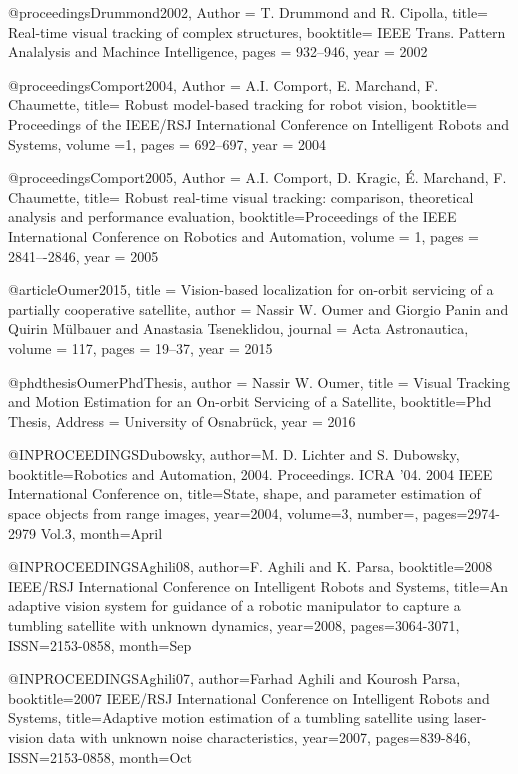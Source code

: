 
@proceedings{Drummond2002,
Author = {T. Drummond and R. Cipolla},
title=  {Real-time visual tracking of complex structures},
booktitle= {IEEE Trans. Pattern Analalysis and Machince Intelligence},
pages = {932--946},
year = {2002}
}

@proceedings{Comport2004,
Author ={ A.I. Comport, E. Marchand, F. Chaumette},
title=  {Robust model-based tracking for robot vision},
booktitle= {Proceedings of the IEEE/RSJ International Conference on Intelligent Robots and Systems},
volume ={1},
pages = {692--697},
year = {2004}
}


@proceedings{Comport2005,
Author = {A.I. Comport, D. Kragic, É. Marchand, F. Chaumette},
title=  {Robust real-time visual tracking: comparison, theoretical analysis and performance evaluation},
booktitle={Proceedings of the IEEE International Conference on Robotics and Automation},
volume = {1},
pages = {2841–-2846},
year = {2005}
}

@article{Oumer2015,
title = {Vision-based localization for on-orbit servicing of a partially cooperative satellite},
author = {Nassir W. Oumer and Giorgio Panin and Quirin Mülbauer and Anastasia Tseneklidou},
journal = {Acta Astronautica},
volume = {117},
pages = {19--37},
year = {2015}
}

@phdthesis{OumerPhdThesis,
author = {Nassir W. Oumer}, 
title = {Visual Tracking and Motion Estimation for an On-orbit Servicing of a Satellite},
booktitle={Phd Thesis},
Address = {University of Osnabrück},
year = {2016}
}

@INPROCEEDINGS{Dubowsky,
author={M. D. Lichter and S. Dubowsky},
booktitle={Robotics and Automation, 2004. Proceedings. ICRA '04. 2004 IEEE International Conference on},
title={State, shape, and parameter estimation of space objects from range images},
year={2004},
volume={3},
number={},
pages={2974-2979 Vol.3},
month={April}}


@INPROCEEDINGS{Aghili08,
author={F. Aghili and K. Parsa},
booktitle={2008 IEEE/RSJ International Conference on Intelligent Robots and Systems},
title={An adaptive vision system for guidance of a robotic manipulator to capture a tumbling satellite with unknown dynamics},
year={2008},
pages={3064-3071},
ISSN={2153-0858},
month={Sep}}




@INPROCEEDINGS{Aghili07,
author={Farhad Aghili and Kourosh Parsa},
booktitle={2007 IEEE/RSJ International Conference on Intelligent Robots and Systems},
title={Adaptive motion estimation of a tumbling satellite using laser-vision data with unknown noise characteristics},
year={2007},
pages={839-846},
ISSN={2153-0858},
month={Oct}}



